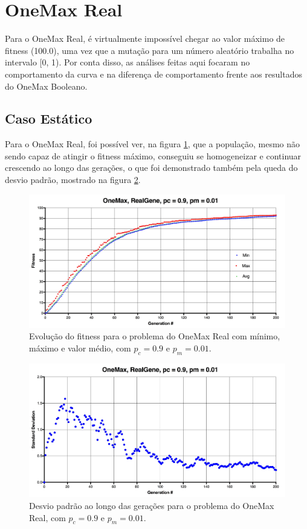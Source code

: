 \section{OneMax Real}

Para o OneMax Real, é virtualmente impossível chegar ao valor máximo de fitness (100.0), uma vez que a mutação para um número aleatório trabalha no intervalo [0, 1). Por conta disso, as análises feitas aqui focaram no comportamento da curva e na diferença de comportamento frente aos resultados do OneMax Booleano.

\subsection{Caso Estático}

Para o OneMax Real, foi possível ver, na figura \ref{fig:onemax_real}, que a população, mesmo não sendo capaz de atingir o fitness máximo, conseguiu se homogeneizar e continuar crescendo ao longo das gerações, o que foi demonstrado também pela queda do desvio padrão, mostrado na figura \ref{fig:onemax_real_std}.

\begin{figure}[ht!]
    \centering \includegraphics[width=1.0\textwidth]{onemax_real.jpg}
    \caption{Evolução do fitness para o problema do OneMax Real com mínimo, máximo e valor médio, com $p_c=0.9$ e $p_m=0.01$.}
    \label{fig:onemax_real}
\end{figure}

\begin{figure}[ht!]
    \centering \includegraphics[width=1.0\textwidth]{onemax_real_std.jpg}
    \caption{Desvio padrão ao longo das gerações para o problema do OneMax Real, com $p_c=0.9$ e $p_m=0.01$.}
    \label{fig:onemax_real_std}
\end{figure}

